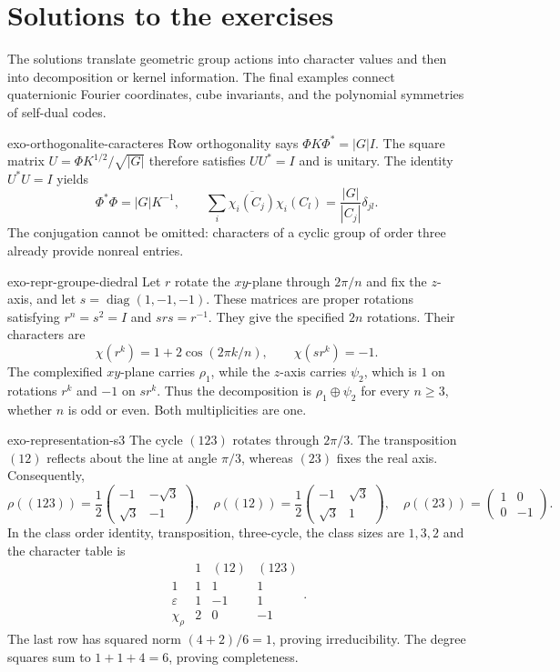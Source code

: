 \clearpage
\section{Solutions to the exercises}
\label{sec-solutions-8-applis-representations}

The solutions translate geometric group actions into character values and
then into decomposition or kernel information. The final examples connect
quaternionic Fourier coordinates, cube invariants, and the polynomial
symmetries of self-dual codes.

\begin{correction}{exo-orthogonalite-caracteres}
Row orthogonality says $\Phi K\Phi^*=|G|I$. The square matrix
$U=\Phi K^{1/2}/\sqrt{|G|}$ therefore satisfies $UU^*=I$ and is unitary.
The identity $U^*U=I$ yields
\[
 \Phi^*\Phi=|G|K^{-1},\qquad
 \sum_i\overline{\chi_i(C_j)}\chi_i(C_l)
    =\frac{|G|}{|C_j|}\delta_{jl}.
\]
The conjugation cannot be omitted: characters of a cyclic group of order
three already provide nonreal entries.
\end{correction}

\begin{correction}{exo-repr-groupe-diedral}
Let $r$ rotate the $xy$-plane through $2\pi/n$ and fix the $z$-axis,
and let $s=\operatorname{diag}(1,-1,-1)$. These matrices are proper
rotations satisfying $r^n=s^2=I$ and $srs=r^{-1}$. They give the
specified $2n$ rotations. Their characters are
\[
 \chi(r^k)=1+2\cos(2\pi k/n),\qquad \chi(sr^k)=-1.
\]
The complexified $xy$-plane carries $\rho_1$, while the $z$-axis
carries $\psi_2$, which is $1$ on rotations $r^k$ and $-1$ on
$sr^k$. Thus the decomposition is $\rho_1\oplus\psi_2$ for every
$n\geq3$, whether $n$ is odd or even. Both multiplicities are one.
\end{correction}

\begin{correction}{exo-representation-s3}
The cycle $(123)$ rotates through $2\pi/3$. The transposition $(12)$
reflects about the line at angle $\pi/3$, whereas $(23)$ fixes the real
axis. Consequently,
\[
 \rho((123))=\frac12\begin{pmatrix}-1&-\sqrt3\\\sqrt3&-1\end{pmatrix},\quad
 \rho((12))=\frac12\begin{pmatrix}-1&\sqrt3\\\sqrt3&1\end{pmatrix},\quad
 \rho((23))=\begin{pmatrix}1&0\\0&-1\end{pmatrix}.
\]
In the class order identity, transposition, three-cycle, the class sizes
are $1,3,2$ and the character table is
\[
 \begin{array}{c|rrr}
 &1&(12)&(123)\\\hline
 1&1&1&1\\\varepsilon&1&-1&1\\\chi_\rho&2&0&-1
 \end{array}.
\]
The last row has squared norm $(4+2)/6=1$, proving irreducibility.
The degree squares sum to $1+1+4=6$, proving completeness.
\end{correction}

